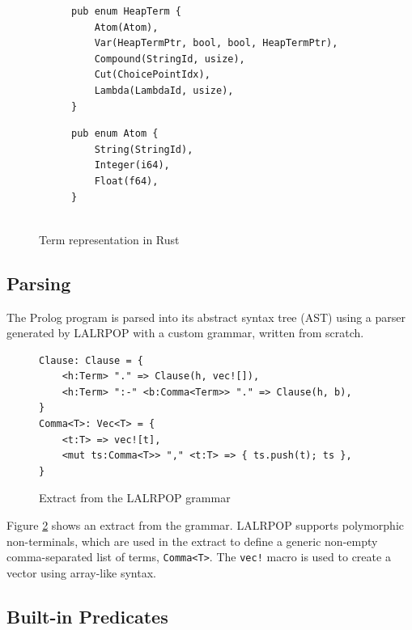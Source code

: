 \begin{figure}[H]
\centering
\begin{subfigure}{0.7\textwidth}
\centering
\begin{verbatim}
pub enum HeapTerm {
    Atom(Atom),
    Var(HeapTermPtr, bool, bool, HeapTermPtr),
    Compound(StringId, usize),
    Cut(ChoicePointIdx),
    Lambda(LambdaId, usize),
}
\end{verbatim}
\end{subfigure}%
\begin{subfigure}{0.3\textwidth}
\centering
\begin{verbatim}
pub enum Atom {
    String(StringId),
    Integer(i64),
    Float(f64),
}


\end{verbatim}
\end{subfigure}
\caption{Term representation in Rust}
\label{fig:rust-term-representation}
\end{figure}

\subsection{Parsing}

The Prolog program is parsed into its abstract syntax tree (AST) using a parser generated by LALRPOP \cite{thelalrpopprojectdevelopersLALRPOPhttpsgithubcom2015} with a custom grammar, written from scratch.

\begin{figure}[H]
\centering
\begin{verbatim}
Clause: Clause = {
    <h:Term> "." => Clause(h, vec![]),
    <h:Term> ":-" <b:Comma<Term>> "." => Clause(h, b),
}
Comma<T>: Vec<T> = {
    <t:T> => vec![t],
    <mut ts:Comma<T>> "," <t:T> => { ts.push(t); ts },
}
\end{verbatim}
\caption{Extract from the LALRPOP grammar}
\label{fig:grammar}
\end{figure}

Figure \ref{fig:grammar} shows an extract from the grammar. LALRPOP supports polymorphic non-terminals, which are used in the extract to define a generic non-empty comma-separated list of terms, \texttt{Comma<T>}. The \texttt{vec!} macro is used to create a vector using array-like syntax.

\subsection{Built-in Predicates}

